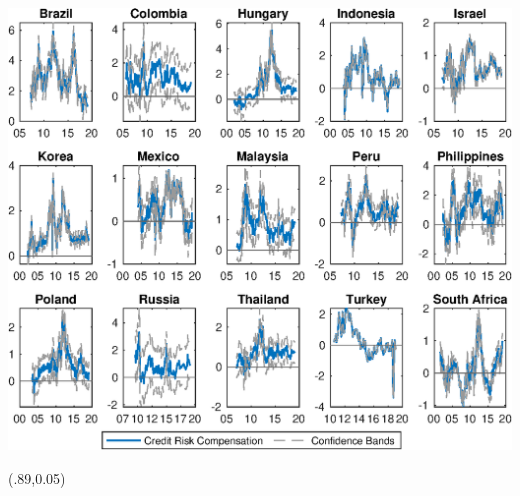 \documentclass[12pt, aspectratio=169, xcolor=dvipsnames]{beamer}  %
\begin{document}
\begin{frame}[label=crcCI]
\begin{center}							%
	\includegraphics[trim={0cm 0cm 0cm 0cm},clip,height=0.86\textheight,width=\linewidth]{../Figures/Estimation/bsl_cr_CI_10y_V1.eps} \\
\end{center}
\begin{textblock*}{5cm}(.89\textwidth,0.05\textheight)
	\hyperlink{YldDcmp}{}
\end{textblock*}
\end{frame}
\end{document}
